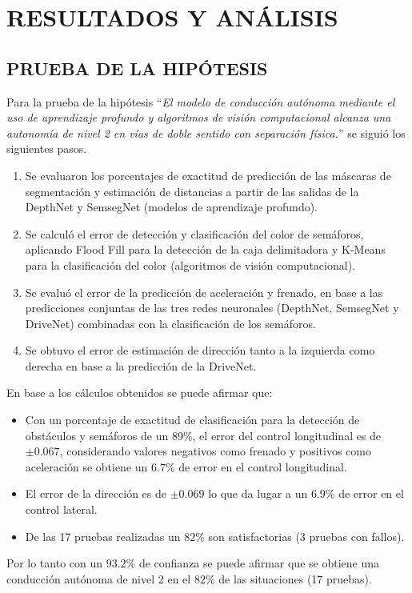 \chapter{RESULTADOS Y ANÁLISIS}
	\negspacesec
	
	
	\pospacesec
	
	
	
	
	\section{PRUEBA DE LA HIPÓTESIS}
	
	Para la prueba de la hipótesis ``\textit{El modelo de conducción autónoma mediante el uso de aprendizaje profundo y algoritmos de visión computacional alcanza una autonomía de nivel 2 en vías de doble sentido con separación física.}'' se siguió los siguientes pasos.
	
	\begin{enumerate}[nosep]
		\item Se evaluaron los porcentajes de exactitud de predicción de las máscaras de segmentación y estimación de distancias a partir de las salidas de la DepthNet y SemsegNet (modelos de aprendizaje profundo).
		\item Se calculó el error de detección y clasificación del color de semáforos, aplicando Flood Fill para la detección de la caja delimitadora y K-Means para la clasificación del color (algoritmos de visión computacional).
		\item Se evaluó el error de la predicción de aceleración y frenado, en base a las predicciones conjuntas de las tres redes neuronales (DepthNet, SemsegNet y DriveNet) combinadas con la clasificación de los semáforos.
		\item Se obtuvo el error de estimación de dirección tanto a la izquierda como derecha en base a la predicción de la DriveNet.
	\end{enumerate}
	
	En base a los cálculos obtenidos se puede afirmar que:
	
	\begin{itemize}[nosep]
		\item Con un porcentaje de exactitud de clasificación para la detección de obstáculos y semáforos de un 89\%, el error del control longitudinal es de $\pm 0.067$, considerando valores negativos como frenado y positivos como aceleración se obtiene un $6.7\%$ de error en el control longitudinal.
		\item El error de la dirección es de $\pm0.069$ lo que da lugar a un $6.9\%$ de error en el control lateral.
		\item De las 17 pruebas realizadas un $82\%$ son satisfactorias (3 pruebas con fallos).
	\end{itemize}

	Por lo tanto con un $93.2\%$ de confianza se puede afirmar que se obtiene una conducción autónoma de nivel 2 en el $82\%$ de las situaciones (17 pruebas).
		